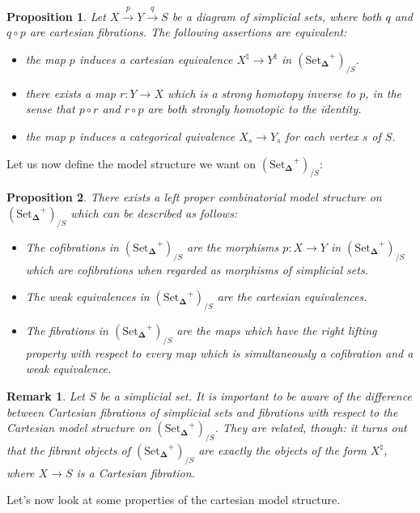 \documentclass{amsart}
\newcommand{\8}{\ensuremath{\infty}}
\newcommand{\SSet}{\ensuremath{\text{Set}_{\boldsymbol{\Delta}}}}
\newtheorem{proposition}{Proposition}
\newtheorem{remark}{Remark}
\begin{document}
\begin{proposition}
  Let $X\xrightarrow{p} Y\xrightarrow{q} S$ be a diagram of simplicial sets, where both $q$ and $q\circ p$ are cartesian fibrations. The following assertions are equivalent:
  \begin{itemize}
    \item[(1)] the map $p$ induces a cartesian equivalence $X^\natural \rightarrow Y^\natural$ in $(\SSet^+)_{/S}$.
    \item[(2)] there exists a map $r:Y\rightarrow X$ which is a strong homotopy inverse to $p$, in the sense that $p\circ r$ and $r\circ p$ are both strongly homotopic to the identity.
    \item[(3)] the map $p$ induces a categorical quivalence $X_s\rightarrow Y_s$ for each vertex $s$ of $S$.
  \end{itemize}
\end{proposition}

Let us now define the model structure we want on $(\SSet^+)_{/S}$:
\begin{proposition}
  There exists a left proper combinatorial model structure on $(\SSet^+)_{/S}$ which can be described as follows:
  \begin{itemize}
    \item[(C)] The cofibrations in $(\SSet^+)_{/S}$ are the morphisms $p:X\rightarrow Y$ in $(\SSet^+)_{/S}$ which are cofibrations when regarded as morphisms of simplicial sets.
    \item[(W)] The weak equivalences in $(\SSet^+)_{/S}$ are the cartesian equivalences.
    \item[(F)] The fibrations in $(\SSet^+)_{/S}$ are the maps which have the right lifting property with respect to every map which is simultaneously a cofibration and a weak equivalence.
  \end{itemize}
\end{proposition}

\begin{remark}
  Let $S$ be a simplicial set. It is important to be aware of the difference between Cartesian fibrations of simplicial sets and fibrations with respect to the Cartesian model structure on $(\SSet^+)_{/S}$. They are related, though: it turns out that the fibrant objects of $(\SSet^+)_{/S}$ are exactly the objects of the form $X^\natural$, where $X\rightarrow S$ is a Cartesian fibration.
\end{remark}

Let's now look at some properties of the cartesian model structure.
\end{document}
